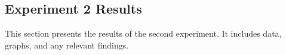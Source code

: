 \subsection{Experiment 2 Results}

This section presents the results of the second experiment. It includes data, graphs, and any relevant findings.
